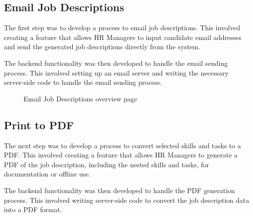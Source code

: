 \subsection{Email Job Descriptions} 
The first step was to develop a process to email job descriptions. This involved creating a feature that allows HR Managers to input candidate email addresses and send the generated job descriptions directly from the system.

The backend functionality was then developed to handle the email sending process. This involved setting up an email server and writing the necessary server-side code to handle the email sending process.


\begin{figure}[H]
    \centering
    \caption{ Email Job Descriptions overview page}
    \label{fig:Email-Job-Descriptions-overview-page}
\end{figure}


\subsection{Print to PDF} 
The next step was to develop a process to convert selected skills and tasks to a PDF. This involved creating a feature that allows HR Managers to generate a PDF of the job description, including the nested skills and tasks, for documentation or offline use.

The backend functionality was then developed to handle the PDF generation process. This involved writing server-side code to convert the job description data into a PDF format.


